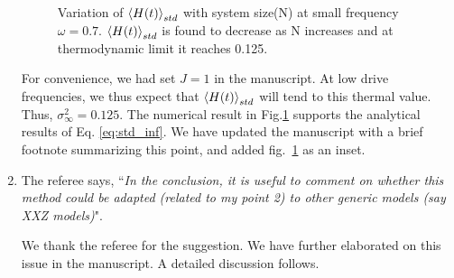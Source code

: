 \documentclass[aps,prb,reprint,showpacs,floatfix,superscriptaddress, onecolumn, nofootinbib, 9pt]{revtex4-2}
\newcommand{\response}[1]{{\color{black}#1}} %
\newcommand{\comment}[1]{{\color{blue}#1}} %
\begin{document}
\begin{enumerate}
{\begin{figure}[h!]
				\caption{Variation of $\expval{H(t)}_{std}$ with system size(N) at small frequency $\omega=0.7$. $\expval{H(t)}_{std}$ is found to decrease as N increases and at thermodynamic limit it reaches 0.125.}
				\label{fig:std_N}
			\end{figure}
			For convenience, we had set $J=1$ in the manuscript. At low drive frequencies, we thus expect that $\expval{H(t)}_{std}$ will tend to this thermal value. Thus, $\sigma_\infty^2 = 0.125$. The numerical result in Fig.\ref{fig:std_N} supports the analytical results of Eq. \eqref{eq:std_inf}. We have updated the manuscript with a brief footnote summarizing this point, and added fig.~\ref{fig:std_N} as an inset.
		}
		
		
		\vskip 2cm
		\item The referee says, \comment{``\textit{In the conclusion, it is useful to comment on whether this method could be adapted (related to my point 2) to other generic models (say XXZ models)}"}.\\
		
		\response{
			We thank the referee for the suggestion. We have further elaborated on this issue in the manuscript. A detailed discussion follows.
			
}
\end{enumerate}
\end{document}
